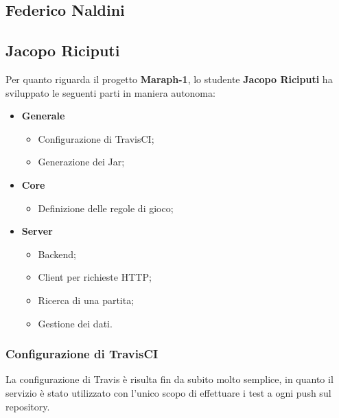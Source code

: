         \subsection{Federico Naldini}\label{subsec:naldini}
        \subsection{Jacopo Riciputi}\label{subsec:riciputi}
	   Per quanto riguarda il progetto \textbf{Maraph-1}, lo studente \textbf{Jacopo Riciputi} ha sviluppato le seguenti parti in maniera autonoma:
        
        \begin{itemize}
        \item \textbf{Generale}
                \begin {itemize} 
		\item Configurazione di TravisCI;
		\item Generazione dei Jar;
		
     	\end {itemize}
         \item \textbf{Core}
                \begin {itemize} 
		 \item Definizione delle regole di gioco;
		
     	\end {itemize}
        \item \textbf{Server}
                \begin {itemize} 
		  \item Backend;
	     \item Client per richieste HTTP;
	     \item Ricerca di una partita;
	     \item Gestione dei dati.
		
     	\end {itemize}
        
	\end {itemize}
	
	\subsubsection{Configurazione di TravisCI}
	  La configurazione di Travis è risulta fin da subito molto semplice, in quanto il servizio è stato utilizzato con l'unico scopo di effettuare i test a ogni push sul repository.
	 
